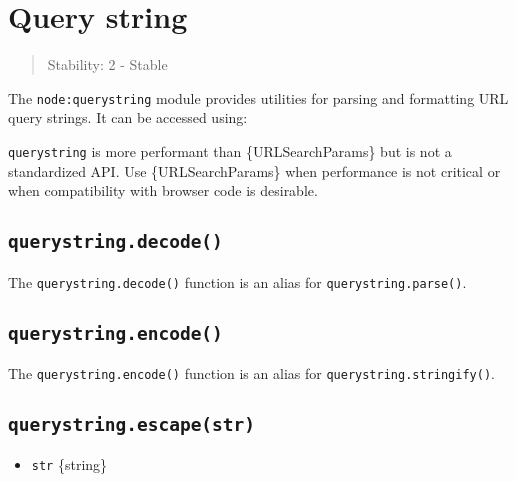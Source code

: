 \section{Query string}\label{query-string}

\begin{quote}
Stability: 2 - Stable
\end{quote}

The \texttt{node:querystring} module provides utilities for parsing and
formatting URL query strings. It can be accessed using:

\begin{Shaded}
\begin{Highlighting}[]
\OperatorTok{=} \NormalTok{(}\NormalTok{)}\OperatorTok{;}
\end{Highlighting}
\end{Shaded}

\texttt{querystring} is more performant than \{URLSearchParams\} but is
not a standardized API. Use \{URLSearchParams\} when performance is not
critical or when compatibility with browser code is desirable.

\subsection{\texorpdfstring{\texttt{querystring.decode()}}{querystring.decode()}}\label{querystring.decode}

The \texttt{querystring.decode()} function is an alias for
\texttt{querystring.parse()}.

\subsection{\texorpdfstring{\texttt{querystring.encode()}}{querystring.encode()}}\label{querystring.encode}

The \texttt{querystring.encode()} function is an alias for
\texttt{querystring.stringify()}.

\subsection{\texorpdfstring{\texttt{querystring.escape(str)}}{querystring.escape(str)}}\label{querystring.escapestr}

\begin{itemize}
\tightlist
\item
  \texttt{str} \{string\}
\end{itemize}

